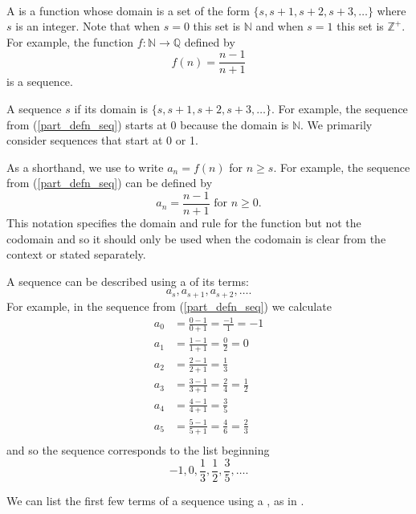 \begin{defn}[Sequence]
\label{defn_seq}
~
    \begin{apart}
        \item \label{part_defn_seq} A  is a function whose domain is a set of the form $\{s,s+1,s+2,s+3,\ldots\}$ where $s$ is an integer. Note that when $s=0$ this set is $\mathbb{N}$ and when $s=1$ this set is $\mathbb{Z}^+$. For example, the function $f: \mathbb{N} \to \mathbb{Q}$ defined by $$f(n) = \frac{n-1}{n+1}$$ is a sequence.  
        
        \item A sequence  $s$ if its domain is $\{s,s+1,s+2,s+3,\ldots\}$. For example, the sequence from (\ref{part_defn_seq}) starts at 0 because the domain is $\mathbb{N}$.  We primarily consider sequences that start at 0 or 1.

        \item As a shorthand, we use  to write $a_n=f(n)$ for $n \ge s$. For example, the sequence from (\ref{part_defn_seq}) can be defined by $$a_n = \frac{n-1}{n+1} \text{ for }n \ge 0.$$ 
        This notation specifies the domain and rule for the function but not the codomain and so it should only be used when the codomain is clear from the context or stated separately.

        \item A sequence can be described using a  of its terms: $$a_s, a_{s+1}, a_{s+2}, \ldots.$$
        For example, in the sequence from (\ref{part_defn_seq}) we calculate
            \begin{align*}
                a_0 & = \frac{0-1}{0+1}=\frac{-1}{1}=-1 \\
                a_1 & = \frac{1-1}{1+1}=\frac{0}{2}=0 \\
                a_2 & = \frac{2-1}{2+1}=\frac{1}{3} \\
                a_3 & = \frac{3-1}{3+1}=\frac{2}{4}=\frac{1}{2} \\
                a_4 & = \frac{4-1}{4+1}=\frac{3}{5} \\
                a_5 & = \frac{5-1}{5+1}=\frac{4}{6}=\frac{2}{3} \\
            \end{align*}
        and so the sequence corresponds to the list beginning
        $$-1, 0, \frac{1}{3}, \frac{1}{2}, \frac{3}{5}, \ldots.$$

        \item We can list the first few terms of a sequence using a , as in .


\end{apart}
\end{defn}
